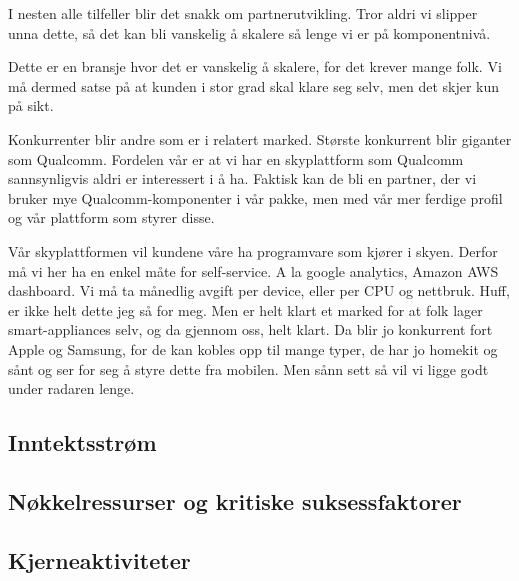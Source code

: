 I nesten alle tilfeller blir det snakk om partnerutvikling. Tror aldri vi
slipper unna dette, så det kan bli vanskelig å skalere så lenge vi er på
komponentnivå.

Dette er en bransje hvor det er vanskelig å skalere, for det krever mange folk.
Vi må dermed satse på at kunden i stor grad skal klare seg selv, men det skjer
kun på sikt.

Konkurrenter blir andre som er i relatert marked. Største konkurrent blir
giganter som Qualcomm. Fordelen vår er at vi har en skyplattform som Qualcomm
sannsynligvis aldri er interessert i å ha. Faktisk kan de bli en partner, der
vi bruker mye Qualcomm-komponenter i vår pakke, men med vår mer ferdige profil
og vår plattform som styrer disse.

Vår skyplattformen vil kundene våre ha programvare som kjører i skyen. Derfor
må vi her ha en enkel måte for self-service. A la google analytics, Amazon AWS
dashboard. Vi må ta månedlig avgift per device, eller per CPU og nettbruk.
Huff, er ikke helt dette jeg så for meg. Men er helt klart et marked for at
folk lager smart-appliances selv, og da gjennom oss, helt klart. Da blir jo
konkurrent fort Apple og Samsung, for de kan kobles opp til mange typer, de har
jo homekit og sånt og ser for seg å styre dette fra mobilen.
Men sånn sett så vil vi ligge godt under radaren lenge.

\subsection{Inntektsstrøm}

\subsection{Nøkkelressurser og kritiske suksessfaktorer}


\subsection{Kjerneaktiviteter}


